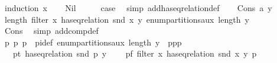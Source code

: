 \begin{isabellebody}
%
\isadelimproof
%
\endisadelimproof
%
\isatagproof
{}\isamarkupfalse%
\ {\isacharparenleft}{\kern0pt}induction\ {\isachardoublequoteopen}x{\isachardoublequoteclose}{\isacharparenright}{\kern0pt}\isanewline
\ \ \isamarkupfalse%
\ Nil\isanewline
\ \ \isamarkupfalse%
\ \isamarkupfalse%
\ {\isacharquery}{\kern0pt}case\ \isamarkupfalse%
\ {\isacharparenleft}{\kern0pt}simp\ add{\isacharcolon}{\kern0pt}has{\isacharunderscore}{\kern0pt}eq{\isacharunderscore}{\kern0pt}relation{\isacharunderscore}{\kern0pt}def{\isacharparenright}{\kern0pt}\isanewline
{}\isamarkupfalse%
\isanewline
\ \ \isamarkupfalse%
\ {\isacharparenleft}{\kern0pt}Cons\ a\ y{\isacharparenright}{\kern0pt}\isanewline
\ \ \isamarkupfalse%
\ {\isachardoublequoteopen}length\ {\isacharparenleft}{\kern0pt}filter\ {\isacharparenleft}{\kern0pt}{\isasymlambda}x{\isachardot}{\kern0pt}\ has{\isacharunderscore}{\kern0pt}eq{\isacharunderscore}{\kern0pt}relation\ {\isacharparenleft}{\kern0pt}snd\ x{\isacharparenright}{\kern0pt}\ y{\isacharparenright}{\kern0pt}\ {\isacharparenleft}{\kern0pt}enum{\isacharunderscore}{\kern0pt}partitions{\isacharunderscore}{\kern0pt}aux\ {\isacharparenleft}{\kern0pt}length\ y{\isacharparenright}{\kern0pt}{\isacharparenright}{\kern0pt}{\isacharparenright}{\kern0pt}\ {\isacharequal}{\kern0pt}\ {}{\isachardoublequoteclose}\isanewline
\ \ \ \ \isamarkupfalse%
\ Cons\ \isamarkupfalse%
\ {\isacharparenleft}{\kern0pt}simp\ add{\isacharcolon}{\kern0pt}comp{\isacharunderscore}{\kern0pt}def{\isacharparenright}{\kern0pt}\ \isanewline
\ \ \isamarkupfalse%
\ \isamarkupfalse%
\ p{}\ p{}\ p{}\ \ pi{\isacharunderscore}{\kern0pt}def{\isacharcolon}{\kern0pt}\ {\isachardoublequoteopen}enum{\isacharunderscore}{\kern0pt}partitions{\isacharunderscore}{\kern0pt}aux\ {\isacharparenleft}{\kern0pt}length\ y{\isacharparenright}{\kern0pt}\ {\isacharequal}{\kern0pt}\ p{}{\isacharat}{\kern0pt}p{}{\isacharhash}{\kern0pt}p{}{\isachardoublequoteclose}\ \isanewline
\ \ \ p{}{\isacharunderscore}{\kern0pt}t{\isacharcolon}{\kern0pt}\ {\isachardoublequoteopen}has{\isacharunderscore}{\kern0pt}eq{\isacharunderscore}{\kern0pt}relation\ {\isacharparenleft}{\kern0pt}snd\ p{}{\isacharparenright}{\kern0pt}\ y{\isachardoublequoteclose}\ \isanewline
\ \ \ p{}{\isacharunderscore}{\kern0pt}f{}{\isacharcolon}{\kern0pt}\ {\isachardoublequoteopen}filter\ {\isacharparenleft}{\kern0pt}{\isasymlambda}x{\isachardot}{\kern0pt}\ has{\isacharunderscore}{\kern0pt}eq{\isacharunderscore}{\kern0pt}relation\ {\isacharparenleft}{\kern0pt}snd\ x{\isacharparenright}{\kern0pt}\ y{\isacharparenright}{\kern0pt}\ p{}\ {\isacharequal}{\kern0pt}\ {\isacharbrackleft}{\kern0pt}{\isacharbrackright}{\kern0pt}{\isachardoublequoteclose}\ \isanewline

\end{isabellebody}
